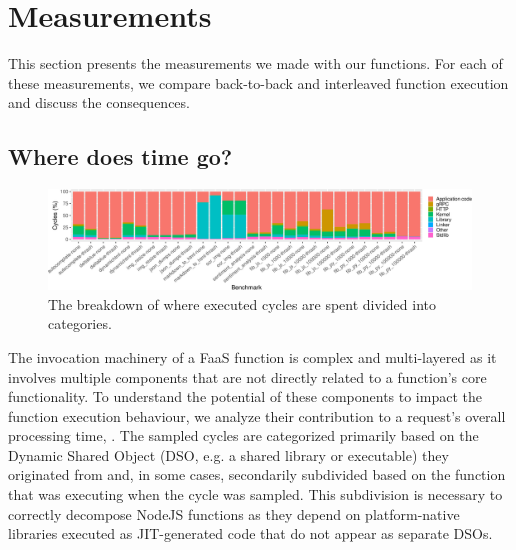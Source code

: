 \section{Measurements}
\label{wosc:sec:measurements}

This section presents the measurements we made with our functions. %
For each of these measurements, we compare back-to-back and interleaved function execution and discuss the consequences.


\subsection{Where does time go?}
\label{wosc:subsec:time}

\begin{figure}
  \centering
  \includegraphics[width=\textwidth]{figures/cycles_per_component.pdf}
  \caption{\label{wosc:fig:cyc_per_component} The breakdown of where executed cycles are spent divided into categories.}
\end{figure}

The invocation machinery of a FaaS function is complex and multi-layered as it involves multiple components that are not directly related to a function's core functionality. To understand the potential of these components to impact the function execution behaviour, we analyze their contribution to a request's overall processing time, . The sampled cycles are categorized primarily based on the Dynamic Shared Object (DSO, e.g. a shared library or executable) they originated from and, in some cases, secondarily subdivided based on the function that was executing when the cycle was sampled. This subdivision is necessary to correctly decompose NodeJS functions as they depend on platform-native libraries executed as JIT-generated code that do not appear as separate DSOs.

